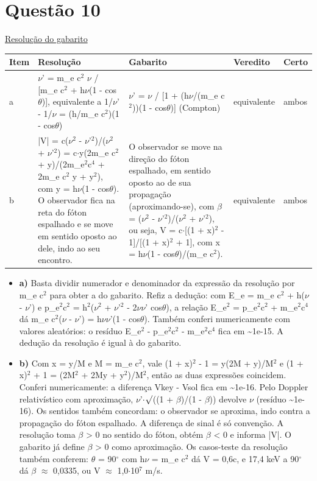 \documentclass{article}%
\begin{document}
\section*{Questão 10}%
\href{https://poliedroresolve.sistemapoliedro.com.br/vestibulares/ita/2027/ita-2-fase-dia-3-22-10-2026-2-fase-dia-3/dissertativa-10-fisica-2-fase-dia-3-ita-2027}{Resolução do gabarito}\par\smallskip%
\begin{longtable}{@{}p{} p{} p{} p{} p{}@{}}\toprule Item & Resolução & Gabarito & Veredito & Certo \\ \midrule
a & $\nu$' = m\_e c$^2$ $\nu$ / {[}m\_e c$^2$ + h$\nu$(1 - cos$\theta$){]}, equivalente a 1/$\nu$' - 1/$\nu$ = (h/m\_e c$^2$)(1 - cos$\theta$) & $\nu$' = $\nu$ / {[}1 + (h$\nu$/(m\_e c$^2$))(1 - cos$\theta$){]} (Compton) & equivalente & ambos \\
b & |V| = c($\nu$$^2$ - $\nu$'$^2$)/($\nu$$^2$ + $\nu$'$^2$) = c$\cdot$y(2m\_e c$^2$ + y)/(2m\_e$^2$c$^{4}$ + 2m\_e c$^2$ y + y$^2$), com y = h$\nu$(1 - cos$\theta$). O observador fica na reta do fóton espalhado e se move em sentido oposto ao dele, indo ao seu encontro. & O observador se move na direção do fóton espalhado, em sentido oposto ao de sua propagação (aproximando{-}se), com $\beta$ = ($\nu$$^2$ - $\nu$'$^2$)/($\nu$$^2$ + $\nu$'$^2$), ou seja, V = c$\cdot${[}(1 + x)$^2$ - 1{]}/{[}(1 + x)$^2$ + 1{]}, com x = h$\nu$(1 - cos$\theta$)/(m\_e c$^2$). & equivalente & ambos \\
\bottomrule\end{longtable}%
\begin{itemize}%
\item%
\textbf{a)} Basta dividir numerador e denominador da expressão da resolução por m\_e c$^2$ para obter a do gabarito. Refiz a dedução: com E\_e = m\_e c$^2$ + h($\nu$ - $\nu$') e p\_e$^2$c$^2$ = h$^2$($\nu$$^2$ + $\nu$'$^2$ - 2$\nu$$\nu$' cos$\theta$), a relação E\_e$^2$ = p\_e$^2$c$^2$ + m\_e$^2$c$^{4}$ dá m\_e c$^2$($\nu$ - $\nu$') = h$\nu$$\nu$'(1 - cos$\theta$). Também conferi numericamente com valores aleatórios: o resíduo E\_e$^2$ - p\_e$^2$c$^2$ - m\_e$^2$c$^{4}$ fica em \textasciitilde{}1e{-}15. A dedução da resolução é igual à do gabarito.%
\item%
\textbf{b)} Com x = y/M e M = m\_e c$^2$, vale (1 + x)$^2$ - 1 = y(2M + y)/M$^2$ e (1 + x)$^2$ + 1 = (2M$^2$ + 2My + y$^2$)/M$^2$, então as duas expressões coincidem. Conferi numericamente: a diferença Vkey - Vsol fica em \textasciitilde{}1e{-}16. Pelo Doppler relativístico com aproximação, $\nu$'$\cdot$$\surd$((1 + $\beta$)/(1 - $\beta$)) devolve $\nu$ (resíduo \textasciitilde{}1e{-}16). Os sentidos também concordam: o observador se aproxima, indo contra a propagação do fóton espalhado. A diferença de sinal é só convenção. A resolução toma $\beta$ > 0 no sentido do fóton, obtém $\beta$ < 0 e informa |V|. O gabarito já define $\beta$ > 0 como aproximação. Os casos{-}teste da resolução também conferem: $\theta$ = 90$^\circ$ com h$\nu$ = m\_e c$^2$ dá V = 0,6c, e 17,4 keV a 90$^\circ$ dá $\beta$ $\approx$ 0,0335, ou V $\approx$ 1,0$\cdot$10$^{7}$ m/s.%
\end{itemize}%
\end{document}
